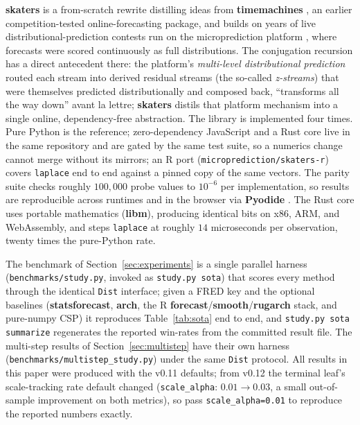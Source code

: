 \documentclass[article]{jss}
\providecommand{\proglang}[1]{\textsf{#1}}
\providecommand{\pkg}[1]{\textbf{#1}}
\providecommand{\code}[1]{\texttt{#1}}
\begin{document}
\pkg{skaters} is a from-scratch rewrite distilling ideas from \pkg{timemachines}
\citep{cotton2021timemachines}, an earlier competition-tested online-forecasting
package, and builds on years of live distributional-prediction contests run on
the microprediction platform \citep{cotton2022microprediction}, where forecasts
were scored continuously as full distributions. The conjugation recursion has a
direct antecedent there: the platform's \emph{multi-level distributional
prediction} routed each stream
into derived residual streams (the so-called \emph{z-streams}) that were
themselves predicted distributionally and composed back, ``transforms all the way
down'' avant la lettre; \pkg{skaters} distils that platform mechanism into a
single online, dependency-free abstraction. The library is implemented four
times. Pure \proglang{Python} is the reference; zero-dependency
\proglang{JavaScript} and a \proglang{Rust} core live in the same
repository and are gated by the same test suite, so a numerics change
cannot merge without its mirrors; an \proglang{R} port
(\code{microprediction/skaters-r}) covers \code{laplace} end to end
against a pinned copy of the same vectors. The parity suite checks
roughly $100{,}000$ probe values to $10^{-6}$ per implementation, so
results are reproducible across runtimes and in the browser via
\pkg{Pyodide} \citep{pyodide2021}. The Rust core uses portable
mathematics (\pkg{libm}), producing identical bits on x86, ARM, and
WebAssembly, and steps \code{laplace} at roughly $14$ microseconds per
observation, twenty times the pure-\proglang{Python} rate.

The benchmark of Section~\ref{sec:experiments} is a single parallel harness
(\code{benchmarks/study.py}, invoked as \code{study.py sota}) that scores every
method through the identical \code{Dist} interface; given a \proglang{FRED} key
and the optional baselines (\pkg{statsforecast}, \pkg{arch}, the \proglang{R}
\pkg{forecast}/\pkg{smooth}/\pkg{rugarch} stack, and pure-\proglang{numpy} CSP) it
reproduces Table~\ref{tab:sota} end to end, and
\code{study.py sota summarize} regenerates the reported win-rates from the
committed result file. The multi-step results of Section~\ref{sec:multistep} have
their own harness (\code{benchmarks/multistep\_study.py}) under the same
\code{Dist} protocol. All results in this paper were produced with the
v0.11 defaults; from v0.12 the terminal leaf's scale-tracking rate default
changed (\code{scale\_alpha}: $0.01 \to 0.03$, a small out-of-sample
improvement on both metrics), so pass \code{scale\_alpha=0.01} to reproduce
the reported numbers exactly.



\end{document}
